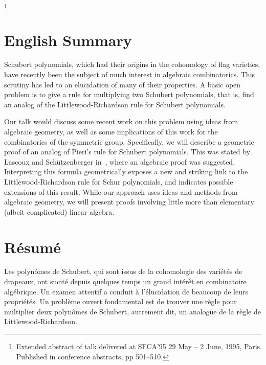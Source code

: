 \thanks{Extended abstract of talk delivered at SFCA'95 29 
May -- 2 June, 1995, Paris.
Published in conference abstracts, pp 501--510.}

\maketitle
\vspace{-.2in}

\section*{English Summary}

Schubert polynomials, which had their origins in 
the cohomology of flag varieties, have recently been the subject 
of much interest in algebraic combinatorics.
This scrutiny has led to an elucidation of many of their 
properties.
A basic open problem is to give a rule for multiplying two 
Schubert polynomials, that is,  find an analog of the 
Littlewood-Richardson rule for Schubert polynomials.

Our talk would discuss some recent work on this problem using 
ideas from algebraic geometry, as well as some implications of this 
work for the combinatorics of the symmetric group.
Specifically, we will describe a geometric proof of an
analog of Pieri's rule for Schubert 
polynomials.
This was stated by Lascoux and 
Sch\"utzenberger in~\cite{Lascoux_Schutzenberger_polynomes_schubert}, 
where an algebraic proof was suggested.
Interpreting this formula geometrically exposes a new and striking link to 
the Littlewood-Richardson rule for Schur polynomials, and indicates 
possible extensions of this result.
While our approach uses ideas and methods from algebraic geometry, 
we will present proofs involving little more than elementary (albeit 
complicated) linear algebra.

\section*{R\'esum\'e} 

Les polyn\^omes de Schubert, qui sont issus
de la cohomologie des vari\'et\'es de drapeaux, ont sucit\'e depuis
quelques temps un grand int\'er\^et en combinatoire alg\'ebrique.
Un examen attentif a conduit \`a l'\'elucidation de beaucoup de leurs
propri\'et\'es. Un probl\`eme ouvert fondamental est de trouver
une r\`egle pour multiplier deux polyn\^omes de Schubert, autrement dit,
un analogue de la r\`egle de Littlewood-Richardson. 

